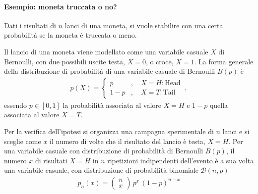 \documentclass[letterpaper,10pt,italian]{jupyterBook}
\begin{document}
\paragraph{Esempio: moneta truccata o no?}
\label{\detokenize{ch/statistics/test-fisher-coin-1:esempio-moneta-truccata-o-no}}
\sphinxAtStartPar
Dati i risultati di \(n\) lanci di una moneta, si vuole stabilire con una certa probabilità se la moneta è truccata o meno.

\sphinxAtStartPar
Il lancio di una moneta viene modellato come una variabile casuale \(X\) di Bernoulli, con due possibili uscite testa, \(X=0\), o croce, \(X=1\). La forma generale della distribuzione di probabilità di una variabile casuale di Bernoulli \(B(p)\) è
\begin{equation*}
\begin{split}p(X) = \begin{cases} p & , \quad X = H:\text{Head} \\ 1-p & , \quad X = T:\text{Tail} \end{cases} \ ,\end{split}
\end{equation*}
\sphinxAtStartPar
essendo \(p \in [0,1]\) la probabilità associata al valore \(X=H\) e \(1-p\) quella associata al valore \(X=T\).

\sphinxAtStartPar
Per la verifica dell’ipotesi si organizza una campagna sperimentale di \(n\) lanci e si sceglie come  \(x\) il numero di volte che il risultato del lancio è testa, \(X=H\).
Per una variabile casuale con distribuzione di probabilità di Bernoulli \(B(p)\), il numero \(x\) di risultati \(X=H\) in \(n\) ripetizioni indipendenti dell’evento è a sua volta una variabile casuale, con distribuzione di probabilità binomiale \(\mathscr{B}(n,p)\)
\begin{equation*}
\begin{split}p_n(x) = \left( \begin{matrix} n \\ x \end{matrix}  \right) \, p^x \, (1-p)^{n-x}\end{split}
\end{equation*}
\end{document}
